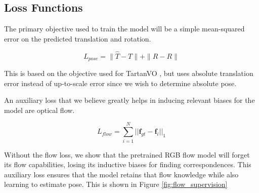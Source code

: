 \documentclass[11pt,a4paper]{article}
\begin{document}
\subsection{Loss Functions}

The primary objective used to train the model will be a simple mean-squared error on the predicted translation and rotation.

\begin{equation} \label{eq:sim1}
L_{pose} = \|\hat{T} - T\| + \|\hat{R} - R\|
\end{equation}

This is based on the objective used for TartanVO \cite{tartanvo}, but uses absolute translation error instead of up-to-scale error since we wish to determine absolute pose. 

An auxiliary loss that we believe greatly helps in inducing relevant biases for the model are optical flow. 

\begin{equation}
    L_{flow} = \sum_{i=1}^{N}||\mathbf{f}_{gt} - \mathbf{f}_i||_1
\end{equation}


Without the flow loss, we show that the pretrained RGB flow model will forget its flow capabilities, losing its inductive biases for finding correspondences. This auxiliary loss ensures that the model retains that flow knowledge while also learning to estimate pose. This is shown in Figure \ref{fig:flow_supervision}
\end{document}
